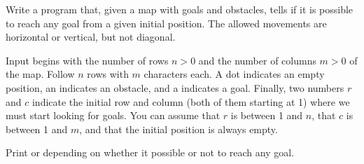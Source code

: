 

\Statement

Write a program that, given a map with goals and obstacles,
tells if it is possible to reach any goal
from a given initial position.
The allowed movements are horizontal or vertical, but not diagonal.


\Input

Input begins with the number of rows $n > 0$
and the number of columns $m > 0$ of the map.
Follow $n$ rows with $m$ characters each.
A dot indicates an empty position,
an  indicates an obstacle,
and a  indicates a goal.
Finally, two numbers $r$ and $c$
indicate the initial row and column (both of them starting at 1)
where we must start looking for goals.
You can assume that $r$ is between 1 and $n$,
that $c$ is between 1 and $m$,
and that the initial position is always empty.


\Output

Print  or 
depending on whether it possible or not to reach any goal.


\Sample
